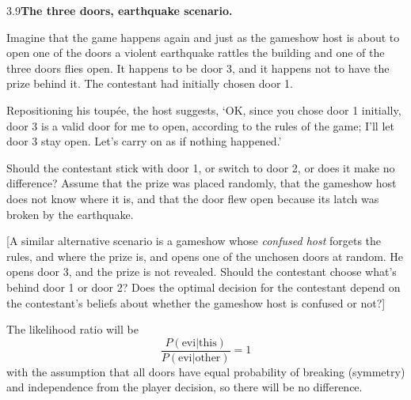 \documentclass[12pt, a4paper]{article}
\begin{document}
\begin{prob}{3.9}\textbf{The three doors, earthquake scenario.}

Imagine that the game happens again and just as the gameshow host is about to open one of the doors a violent earthquake rattles the building and one of the three doors flies open. It happens to be door 3, and it happens not to have the prize behind it. The contestant had initially chosen door 1.

Repositioning his toup\'{e}e, the host suggests, `OK, since you chose door 1 initially, door 3 is a valid door for me to open, according to the rules of the game; I'll let door 3 stay open. Let's carry on as if nothing happened.'

Should the contestant stick with door 1, or switch to door 2, or does it make no difference? Assume that the prize was placed randomly, that the gameshow host does not know where it is, and that the door flew open because its latch was broken by the earthquake.

[A similar alternative scenario is a gameshow whose \textit{confused host} forgets the rules, and where the prize is, and opens one of the unchosen doors at random. He opens door 3, and the prize is not revealed. Should the contestant choose what's behind door 1 or door 2? Does the optimal decision for the contestant depend on the contestant's beliefs about whether the gameshow host is confused or not?]
\end{prob}
\begin{sol}
    The likelihood ratio will be
        $$\frac{P(\text{evi} | \text{this})}{P(\text{evi} | \text{other})} = 1$$
    with the assumption that all doors have equal probability of breaking (symmetry) and independence from the player decision, so there will be no difference.
\end{sol}
\bigskip
\end{document}
